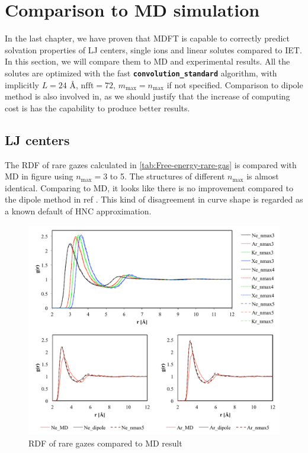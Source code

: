 
\chapter{Comparison to MD simulation\label{chpt:ions}}

In the last chapter, we have proven that \acs{MDFT} is capable to
correctly predict solvation properties of LJ centers, single ions
and linear solutes compared to \acs{IET}. In this section, we will
compare them to \acs{MD} and experimental results. All the solutes
are optimized with the fast \texttt{\textbf{convolution\_standard}}
algorithm, with implicitly $L=24$ $\textrm{Å}$, $\mathrm{nfft}=72$,
$m_{\max}=n_{\max}$ if not specified. Comparison to dipole method
is also involved in, as we should justify that the increase of computing
cost is has the capability to produce better results.

\section{LJ centers}

The \acs{RDF} of rare gazes calculated in \ref{tab:Free-energy-rare-gas}
is compared with \acs{MD} in figure using $n_{\max}=3$ to 5. The
structures of different $n_{\max}$ is almost identical. Comparing
to \acs{MD}, it looks like there is no improvement compared to the
dipole method in ref \citep{Zhao_2011}. This kind of disagreement
in curve shape is regarded as a known default of \acs{HNC} approximation.

\begin{figure}[h]
\begin{centering}
\includegraphics[width=0.9\columnwidth]{_figure/results/rare_gaz}
\par\end{centering}
\caption{\acs{RDF} of rare gazes compared to \acs{MD} result}
\end{figure}


